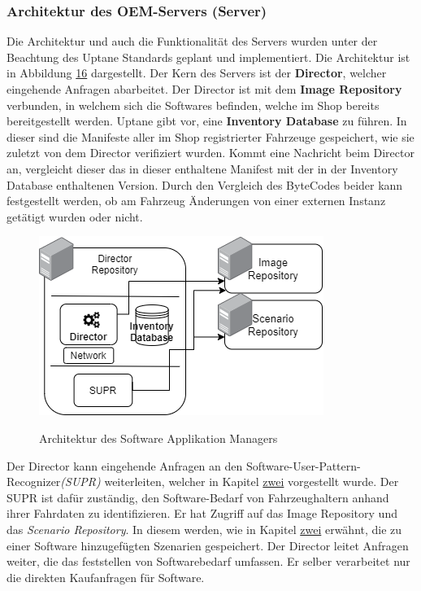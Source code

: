 \subsubsection{Architektur des OEM-Servers (Server)}
Die Architektur und auch die Funktionalität des Servers wurden unter der Beachtung des Uptane Standards geplant und implementiert. Die Architektur ist in Abbildung \hyperref[img:server]{16} dargestellt. Der Kern des Servers ist der \textbf{Director}, welcher eingehende Anfragen abarbeitet. Der Director ist mit dem\textbf{ Image Repository} verbunden, in welchem sich die Softwares befinden, welche im Shop bereits bereitgestellt werden. Uptane gibt vor, eine \textbf{Inventory Database} zu führen. In dieser sind die Manifeste aller im Shop registrierter Fahrzeuge gespeichert, wie sie zuletzt von dem Director verifiziert wurden. Kommt eine Nachricht beim Director an, vergleicht dieser das in dieser enthaltene Manifest mit der in der Inventory Database enthaltenen Version. Durch den Vergleich des ByteCodes beider kann festgestellt werden, ob am Fahrzeug Änderungen von einer externen Instanz getätigt wurden oder nicht.
\begin{figure}[!h]
	\centering
	\includegraphics[width=0.75\columnwidth]{pictures/konzept-OEM-vs.png}
	\label{img:server}
	\caption{Architektur des Software Applikation Managers}
\end{figure}

Der Director kann eingehende Anfragen an den Software-User-Pattern-Recognizer\textit{(SUPR)} weiterleiten, welcher in Kapitel \hyperref[fs]{zwei} vorgestellt wurde. Der SUPR ist dafür zuständig, den Software-Bedarf von Fahrzeughaltern anhand ihrer Fahrdaten zu identifizieren. Er hat Zugriff auf das Image Repository und das \textit{Scenario Repository}. In diesem werden, wie in Kapitel \hyperref[konzept]{zwei} erwähnt, die zu einer Software hinzugefügten Szenarien gespeichert. Der Director leitet Anfragen weiter, die das feststellen von Softwarebedarf umfassen. Er selber verarbeitet nur die direkten Kaufanfragen für Software.

